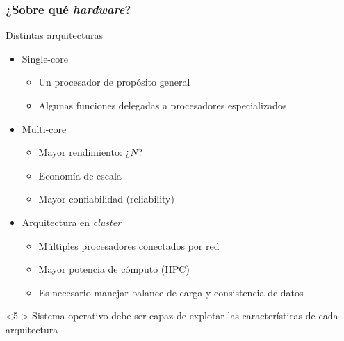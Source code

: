 \documentclass[letter]{beamer}
\begin{document}
\begin{frame}
  \frametitle{¿Sobre qué {\em hardware}?}
  
  Distintas arquitecturas
  \begin{itemize}
    \item<2-> Single-core
      \begin{itemize}
        \item Un procesador de propósito general
        \item Algunas funciones delegadas a procesadores especializados
      \end{itemize}
    \item<3-> Multi-core
      \begin{itemize}
        \item Mayor rendimiento: ¿$N$?
        \item Economía de escala
        \item Mayor confiabilidad (reliability)
      \end{itemize}
    \item<4-> Arquitectura en {\em cluster}
      \begin{itemize}
        \item Múltiples procesadores conectados por red 
        \item Mayor potencia de cómputo (HPC)
        \item Es necesario manejar balance de carga y consistencia de datos
      \end{itemize}
  \end{itemize}
  
  \begin{block}<5->{}
  Sistema operativo debe ser capaz de explotar las características de cada arquitectura
  \end{block}
\end{frame}
\end{document}
